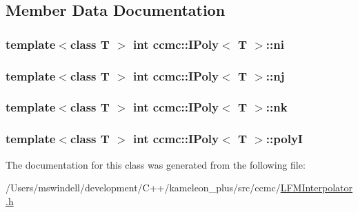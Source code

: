 \subsection{Member Data Documentation}
\hypertarget{classccmc_1_1_i_poly_acc18cf8374b6dc4b5f7ba6d618b63450}{
\subsubsection[{ni}]{\setlength{\rightskip}{0pt plus 5cm}template$<$class T $>$ int {\bf ccmc\-::\-I\-Poly}$<$ T $>$\-::ni}}\label{classccmc_1_1_i_poly_acc18cf8374b6dc4b5f7ba6d618b63450}
\hypertarget{classccmc_1_1_i_poly_a83b93fc10fc608cde13d8750630e5e8a}{
\subsubsection[{nj}]{\setlength{\rightskip}{0pt plus 5cm}template$<$class T $>$ int {\bf ccmc\-::\-I\-Poly}$<$ T $>$\-::nj}}\label{classccmc_1_1_i_poly_a83b93fc10fc608cde13d8750630e5e8a}
\hypertarget{classccmc_1_1_i_poly_a374a6273e608cf09d71173baf4e3593b}{
\subsubsection[{nk}]{\setlength{\rightskip}{0pt plus 5cm}template$<$class T $>$ int {\bf ccmc\-::\-I\-Poly}$<$ T $>$\-::nk}}\label{classccmc_1_1_i_poly_a374a6273e608cf09d71173baf4e3593b}
\hypertarget{classccmc_1_1_i_poly_a2b001122fdcd1d21eae47e24f4ba7f0e}{
\subsubsection[{poly\-I}]{\setlength{\rightskip}{0pt plus 5cm}template$<$class T $>$ int {\bf ccmc\-::\-I\-Poly}$<$ T $>$\-::poly\-I}}\label{classccmc_1_1_i_poly_a2b001122fdcd1d21eae47e24f4ba7f0e}


The documentation for this class was generated from the following file\-:\begin{DoxyCompactItemize}
\item 
/\-Users/mswindell/development/\-C++/kameleon\-\_\-plus/src/ccmc/\hyperlink{_l_f_m_interpolator_8h}{L\-F\-M\-Interpolator.\-h}\end{DoxyCompactItemize}
